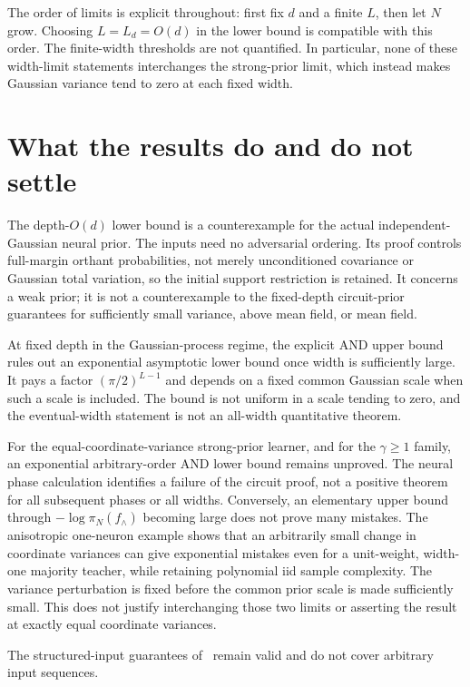 \documentclass[11pt]{article}
\begin{document}
The order of limits is explicit throughout: first fix $d$ and a finite
$L$, then let $N$ grow. Choosing $L=L_d=O(d)$ in the lower bound is
compatible with this order. The finite-width thresholds are not
quantified. In particular, none of these width-limit statements
interchanges the strong-prior limit, which instead makes Gaussian
variance tend to zero at each fixed width.





\section{What the results do and do not settle}
The depth-$O(d)$ lower bound is a counterexample for the actual
independent-Gaussian neural prior. The inputs need no adversarial
ordering. Its proof controls full-margin orthant probabilities, not
merely unconditioned covariance or Gaussian total variation, so the
initial support restriction is retained. It concerns a weak prior;
it is not a counterexample to the fixed-depth circuit-prior guarantees
for sufficiently small variance, above mean field, or mean field.

At fixed depth in the Gaussian-process regime, the explicit AND
upper bound rules out an exponential asymptotic lower bound once width
is sufficiently large. It pays a factor $(\pi/2)^{L-1}$ and depends on
a fixed common Gaussian scale when such a scale is included. The bound
is not uniform in a scale tending to zero, and the eventual-width
statement is not an all-width quantitative theorem.

For the equal-coordinate-variance strong-prior learner, and for the
$\gamma\ge1$ family, an exponential arbitrary-order AND lower bound
remains unproved. The neural phase calculation identifies a failure
of the circuit proof, not a positive theorem for all subsequent phases
or all widths. Conversely, an elementary upper bound through
$-\log\pi_N(f_\wedge)$ becoming large does not prove many mistakes.
The anisotropic one-neuron example shows that an arbitrarily small
change in coordinate variances can give exponential mistakes even for
a unit-weight, width-one majority teacher, while retaining polynomial
iid sample complexity. The variance perturbation is fixed before
the common prior scale is made sufficiently small. This does not
justify interchanging those two limits or asserting the result at
exactly equal coordinate variances.

The structured-input guarantees of~\cite{neural-online} remain valid
and do not cover arbitrary input sequences.
\end{document}
